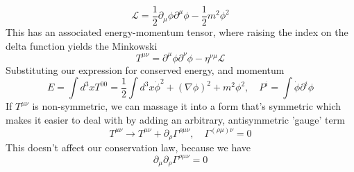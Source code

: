\[ 
\mathcal{L}  = \frac{1}{ 2} \partial_\mu \phi \partial^\mu \phi  - \frac{1} {2}  m^2 \phi^2 
\] 
This has an associated energy-momentum tensor, where raising the index on the delta function yields the Minkowski 
\[ 	
T^{\mu\nu}  = \partial^\mu \phi \partial^\nu \phi  - \eta^{\nu\mu} \mathcal{L } 
\]
Substituting our expression for conserved energy, and momentum 
\[ 
E = \int d^3 x T^{00}  =  \frac{1}{ 2}  \int d^3 x \dot{\phi}^2 + (\nabla \phi)^2 + m^2 \phi^2, \quad P^i  = \int \dot{\phi} \partial^i \phi 
\] 
If $T^{ \mu \nu }$ is non-symmetric, we can massage it into a form that's symmetric which makes it easier to deal with by adding an arbitrary, antisymmetric 'gauge' term 
\[ 
T^{\mu \nu} \rightarrow T^{\mu \nu} + \partial_\rho \Gamma^{ \rho \mu \nu}, \quad  \Gamma^{(\rho \mu) \nu }  = 0
\] This doesn't affect our conservation law, because we have
\[ 
\partial_\mu \partial_\rho \Gamma^{\rho \mu \nu} = 0 
\] 


